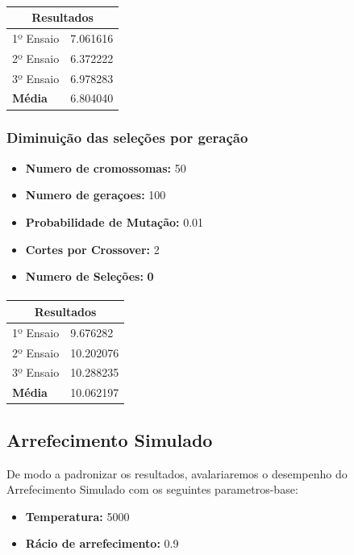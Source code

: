 \documentclass[a4paper]{article}
\begin{document}
\paragraph{}
\begin{center}
	\begin{tabular}{ |l|l| }
		\hline
		\multicolumn{2}{|c|}{Resultados} \\
		\hline
		1º Ensaio & 7.061616 \\
		2º Ensaio & 6.372222 \\
		3º Ensaio & 6.978283 \\
		\textbf{Média} & 6.804040 \\
		\hline
	\end{tabular}
\end{center}

\paragraph{}
\subsubsection{Diminuição das seleções por geração}
\begin{itemize}
	\item \textbf{Numero de cromossomas:} 50
	\item \textbf{Numero de geraçoes:} 100
	\item \textbf{Probabilidade de Mutação:} 0.01
	\item \textbf{Cortes por Crossover:} 2
	\item \textbf{Numero de Seleções:} \textbf{0}
\end{itemize}
\paragraph{}
\begin{center}
	\begin{tabular}{ |l|l| }
		\hline
		\multicolumn{2}{|c|}{Resultados} \\
		\hline
		1º Ensaio & 9.676282 \\
		2º Ensaio & 10.202076 \\
		3º Ensaio & 10.288235 \\
		\textbf{Média} & 10.062197 \\
		\hline
	\end{tabular}
\end{center}

\newpage
\subsection{Arrefecimento Simulado}
De modo a padronizar os resultados, avalariaremos o desempenho do Arrefecimento Simulado com os seguintes parametros-base:
\begin{itemize}
	\item \textbf{Temperatura:} 5000
	\item \textbf{Rácio de arrefecimento:} 0.9
\end{itemize}
\end{document}
